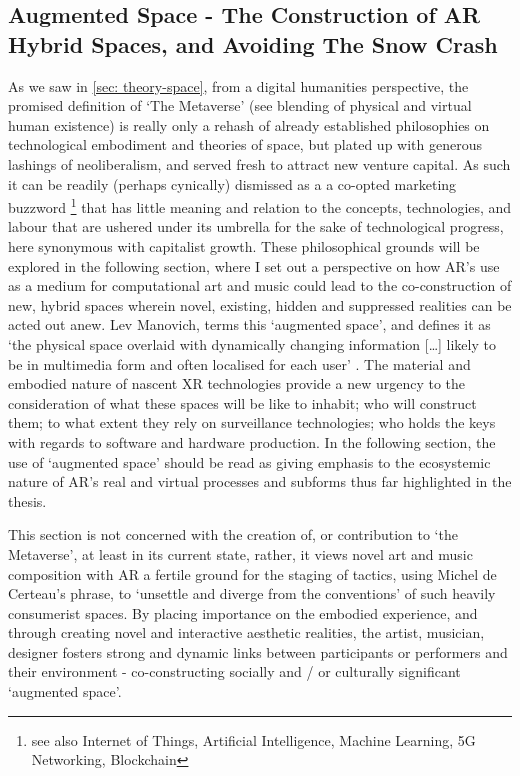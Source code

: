 \subsection[Augmented Space]{Augmented Space - The Construction of AR Hybrid Spaces, and Avoiding The Snow Crash} \label{sec: discussion-medium-space}
As we saw in \autoref{sec: theory-space}, from a digital humanities perspective, the promised definition of `The Metaverse' (see blending of physical and virtual human existence) is really only a rehash of already established philosophies on technological embodiment and theories of space, but plated up with generous lashings of neoliberalism, and served fresh to attract new venture capital. As such it can be readily (perhaps cynically) dismissed as a a co-opted marketing buzzword \footnote{see also Internet of Things, Artificial Intelligence, Machine Learning, 5G Networking, Blockchain} that has little meaning and relation to the concepts, technologies, and labour that are ushered under its umbrella for the sake of technological progress, here synonymous with capitalist growth. These philosophical grounds will be explored in the following section, where I set out a perspective on how AR's use as a medium for computational art and music could lead to the co-construction of new, hybrid spaces wherein novel, existing, hidden and suppressed realities can be acted out anew. Lev Manovich, terms this `augmented space', and defines it as `the physical space overlaid with dynamically changing information […] likely to be in multimedia form and often localised for each user' \citep[p. 2]{manovich2006}. The material and embodied nature of nascent XR technologies provide a new urgency to the consideration of what these spaces will be like to inhabit; who will construct them; to what extent they rely on surveillance technologies; who holds the keys with regards to software and hardware production. In the following section, the use of `augmented space' should be read as giving emphasis to the ecosystemic nature of AR's real and virtual processes and subforms thus far highlighted in the thesis. 

This section is not concerned with the creation of, or contribution to `the Metaverse', at least in its current state, rather, it views novel art and music composition with AR a fertile ground for the staging of tactics, using Michel de Certeau's phrase, to `unsettle and diverge from the conventions' \citeyearpar[p. 36]{decerteau1984} of such heavily consumerist spaces. By placing importance on the embodied experience, and through creating novel and interactive aesthetic realities, the artist, musician, designer fosters strong and dynamic links between participants or performers and their environment - co-constructing socially and / or culturally significant `augmented space'.

